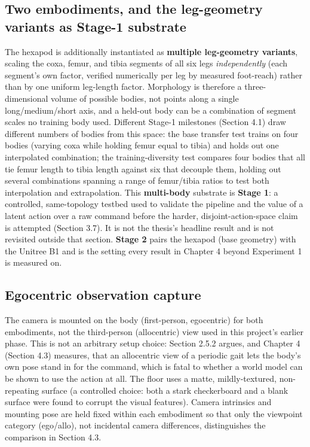 \documentclass[12pt,a4paper,oneside]{report}
\begin{document}
\subsection{Two embodiments, and the leg-geometry variants as Stage-1 substrate}
The hexapod is additionally instantiated as \textbf{multiple leg-geometry variants}, scaling the coxa, femur, and
tibia segments of all six legs \emph{independently} (each segment's own factor, verified numerically per leg by
measured foot-reach) rather than by one uniform leg-length factor. Morphology is therefore a three-dimensional
volume of possible bodies, not points along a single long/medium/short axis, and a held-out body can be a
combination of segment scales no training body used. Different Stage-1 milestones (Section 4.1) draw different
numbers of bodies from this space: the base transfer test trains on four bodies (varying coxa while holding
femur equal to tibia) and holds out one interpolated combination; the training-diversity test compares four
bodies that all tie femur length to tibia length against six that decouple them, holding out several
combinations spanning a range of femur/tibia ratios to test both interpolation and extrapolation. This
\textbf{multi-body} substrate is \textbf{Stage 1}: a controlled, same-topology testbed used to validate the
pipeline and the value of a latent action over a raw command before the harder, disjoint-action-space claim is
attempted (Section 3.7). It is not the thesis's headline result and is not revisited outside that section.
\textbf{Stage 2} pairs the hexapod (base geometry) with the Unitree B1 and is the setting every result in
Chapter 4 beyond Experiment 1 is measured on.

\subsection{Egocentric observation capture}
The camera is mounted on the body (first-person, egocentric) for both embodiments, not the third-person
(allocentric) view used in this project's earlier phase. This is not an arbitrary setup choice: Section 2.5.2
argues, and Chapter 4 (Section 4.3) measures, that an allocentric view of a periodic gait lets the body's own
pose stand in for the command, which is fatal to whether a world model can be shown to use the action at all. The
floor uses a matte, mildly-textured, non-repeating surface (a controlled choice: both a stark checkerboard and a
blank surface were found to corrupt the visual features). Camera intrinsics and mounting pose are held fixed
within each embodiment so that only the viewpoint category (ego/allo), not incidental camera differences,
distinguishes the comparison in Section 4.3.
\end{document}
